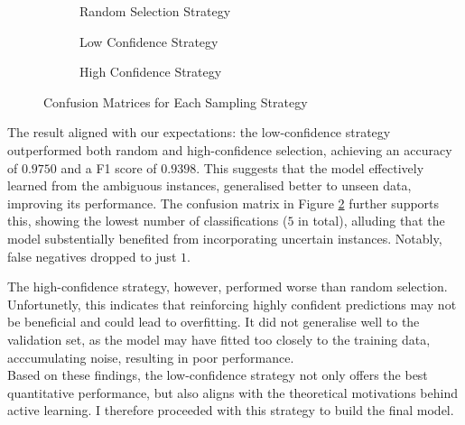 \documentclass[a4paper,12pt]{article}
\begin{document}
\begin{figure}[H]
    \centering

    \begin{subfigure}[b]{0.45\textwidth}
        \centering
        
        \caption{Random Selection Strategy}
        \label{fig:random}
    \end{subfigure}
    \hfill
    \begin{subfigure}[b]{0.45\textwidth}
        \centering
        
        \caption{Low Confidence Strategy}
        \label{fig:low_conf}
    \end{subfigure}

    \vspace{1em}

    \begin{subfigure}[b]{0.5\textwidth}
        \centering
        
        \caption{High Confidence Strategy}
        \label{fig:high_conf}
    \end{subfigure}

    \caption{Confusion Matrices for Each Sampling Strategy}
    \label{fig:confusion_matrices}
\end{figure}

The result aligned with our expectations: the low-confidence strategy outperformed both random and high-confidence selection, achieving an accuracy of $0.9750$ and a F1 score of $0.9398$. This suggests that the model effectively learned from the ambiguous instances, generalised better to unseen data, improving its performance. The confusion matrix in Figure \ref{fig:low_conf} further supports this, showing the lowest number of classifications ($5$ in total), alluding that the model substentially benefited from incorporating uncertain instances. Notably, false negatives dropped to just $1$.

The high-confidence strategy, however, performed worse than random selection. Unfortunetly, this indicates that reinforcing highly confident predictions may not be beneficial and could lead to overfitting. It did not generalise well to the validation set, as the model may have fitted too closely to the training data, acccumulating noise, resulting in poor performance. \\

Based on these findings, the low-confidence strategy not only offers the best quantitative performance, but also aligns with the theoretical motivations behind active learning. I therefore proceeded with this strategy to build the final model.
\end{document}
